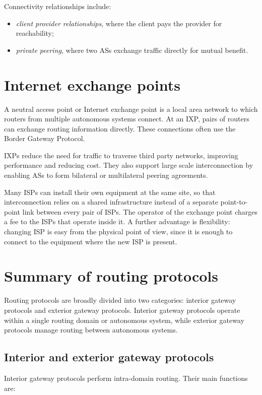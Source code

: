 \documentclass[11pt,a4paper,openany]{report}
\begin{document}
Connectivity relationships include:

\begin{itemize}
\item \emph{client provider relationships}, where the client pays the provider for reachability;
\item \emph{private peering}, where two ASs exchange traffic directly for mutual benefit.
\end{itemize}

\section{Internet exchange points}

A neutral access point or Internet exchange point is a local area network to which routers from multiple autonomous systems connect. At an IXP, pairs of routers can exchange routing information directly. These connections often use the Border Gateway Protocol.

IXPs reduce the need for traffic to traverse third party networks, improving performance and reducing cost. They also support large scale interconnection by enabling ASs to form bilateral or multilateral peering agreements.

Many ISPs can install their own equipment at the same site, so that
interconnection relies on a shared infrastructure instead of a separate
point-to-point link between every pair of ISPs. The operator of the exchange
point charges a fee to the ISPs that operate inside it. A further advantage is
flexibility: changing ISP is easy from the physical point of view, since it is
enough to connect to the equipment where the new ISP is present.

\section{Summary of routing protocols}

Routing protocols are broadly divided into two categories: interior gateway protocols and exterior gateway protocols. Interior gateway protocols operate within a single routing domain or autonomous system, while exterior gateway protocols manage routing between autonomous systems.

\subsection{Interior and exterior gateway protocols}

Interior gateway protocols perform intra-domain routing. Their main functions are:
\end{document}

